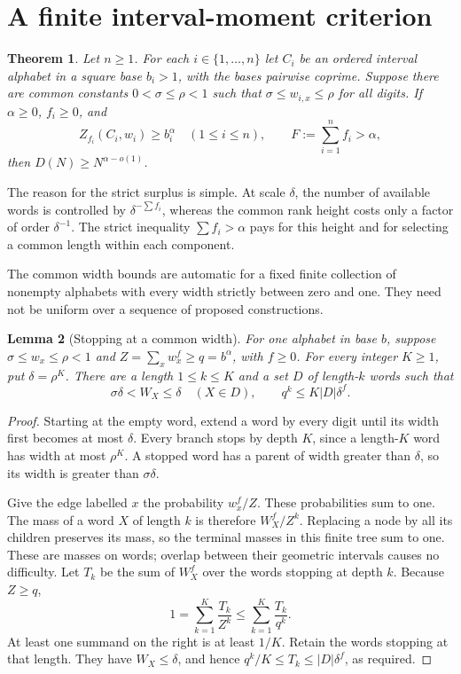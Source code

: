 \documentclass[11pt]{article}
\newtheorem{theorem}{Theorem}[section]
\newtheorem{lemma}[theorem]{Lemma}
\theoremstyle{definition}
\theoremstyle{remark}
\begin{document}
\section{A finite interval-moment criterion}\label{sec:criterion}
\begin{theorem}\label{thm:criterion}
Let $n\ge1$. For each $i\in\{1,\ldots,n\}$ let $C_i$ be an ordered
interval alphabet in a square base $b_i>1$, with the bases pairwise coprime.
Suppose there are common constants $0<\sigma\le\rho<1$ such that
$\sigma\le w_{i,x}\le\rho$ for all digits. If $\alpha\ge0$, $f_i\ge0$,
and
\[
 Z_{f_i}(C_i,w_i)\ge b_i^\alpha\quad(1\le i\le n),
 \qquad F:=\sum_{i=1}^nf_i>\alpha,
\]
then $D(N)\ge N^{\alpha-o(1)}$.
\end{theorem}
The reason for the strict surplus is simple. At scale $\delta$, the
number of available words is controlled by $\delta^{-\sum f_i}$,
whereas the common rank height costs only a factor of order
$\delta^{-1}$. The strict inequality $\sum f_i>\alpha$ pays for this
height and for selecting a common length within each component.

The common width bounds are automatic for a fixed finite collection of
nonempty alphabets with every width strictly between zero and one. They need
not be uniform over a sequence of proposed constructions.

\begin{lemma}[Stopping at a common width]\label{lem:stopping}
For one alphabet in base $b$, suppose $\sigma\le w_x\le\rho<1$ and
$Z=\sum_xw_x^f\ge q=b^\alpha$, with $f\ge0$.
For every integer $K\ge1$, put $\delta=\rho^K$. There are a length
$1\le k\le K$ and a set $D$ of length-$k$ words such that
\[
 \sigma\delta<W_X\le\delta\quad(X\in D),\qquad
 q^k\le K|D|\delta^f.
\]
\end{lemma}
\begin{proof}
Starting at the empty word, extend a word by every digit until its width
first becomes at most $\delta$. Every branch stops by depth $K$, since a
length-$K$ word has width at most $\rho^K$. A stopped word has a parent
of width greater than $\delta$, so its width is greater than
$\sigma\delta$.

Give the edge labelled $x$ the probability $w_x^f/Z$. These probabilities
sum to one. The mass of a word $X$ of length $k$ is therefore $W_X^f/Z^k$.
Replacing a node by all its children preserves its mass, so the terminal
masses in this finite tree sum to one. These are masses on words;
overlap between their geometric intervals causes no difficulty.
Let $T_k$ be the sum of $W_X^f$ over the words stopping at depth $k$.
Because $Z\ge q$,
\[
 1=\sum_{k=1}^K\frac{T_k}{Z^k}
 \le\sum_{k=1}^K\frac{T_k}{q^k}.
\]
At least one summand on the right is at least $1/K$. Retain the words
stopping at that length. They have $W_X\le\delta$, and hence
$q^k/K\le T_k\le |D|\delta^f$, as required.
\end{proof}
\end{document}
